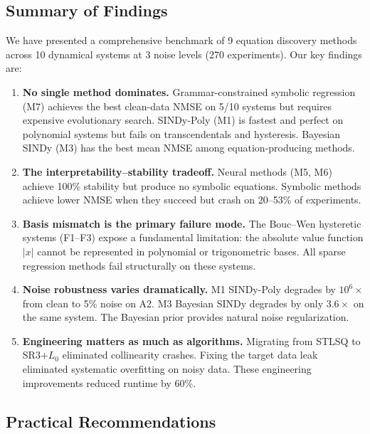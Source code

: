 \documentclass[conference]{IEEEtran}
\begin{document}
\subsection{Summary of Findings}

We have presented a comprehensive benchmark of 9 equation discovery methods across 10 dynamical systems at 3 noise levels (270 experiments). Our key findings are:

\begin{enumerate}
    \item \textbf{No single method dominates.} Grammar-constrained symbolic regression (M7) achieves the best clean-data NMSE on 5/10 systems but requires expensive evolutionary search. SINDy-Poly (M1) is fastest and perfect on polynomial systems but fails on transcendentals and hysteresis. Bayesian SINDy (M3) has the best mean NMSE among equation-producing methods.
    
    \item \textbf{The interpretability--stability tradeoff.} Neural methods (M5, M6) achieve 100\% stability but produce no symbolic equations. Symbolic methods achieve lower NMSE when they succeed but crash on 20--53\% of experiments.
    
    \item \textbf{Basis mismatch is the primary failure mode.} The Bouc--Wen hysteretic systems (F1--F3) expose a fundamental limitation: the absolute value function $|x|$ cannot be represented in polynomial or trigonometric bases. All sparse regression methods fail structurally on these systems.
    
    \item \textbf{Noise robustness varies dramatically.} M1 SINDy-Poly degrades by $10^6\times$ from clean to 5\% noise on A2. M3 Bayesian SINDy degrades by only $3.6\times$ on the same system. The Bayesian prior provides natural noise regularization.
    
    \item \textbf{Engineering matters as much as algorithms.} Migrating from STLSQ to SR3+$L_0$ eliminated collinearity crashes. Fixing the target data leak eliminated systematic overfitting on noisy data. These engineering improvements reduced runtime by 60\%.
\end{enumerate}

\subsection{Practical Recommendations}
\end{document}
